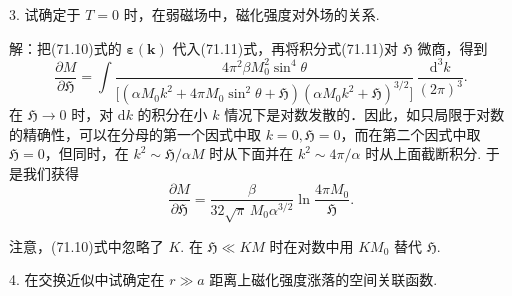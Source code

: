 \begin{xiti}
3. 试确定于 $T=0$ 时，在弱磁场中，磁化强度对外场的关系.

{\heiti 解：}把(71.10)式的 $\bm{\varepsilon}(\bm{k})$ 代入(71.11)式，再将积分式(71.11)对 $\mathfrak{H}$ 微商，得到
\begin{equation*}
\frac{\partial M}{\partial\mathfrak{H}}=\int
\frac{4\pi^2\beta M_0^2\sin^4\theta}
{\bigl[(\alpha M_0k^2+4\pi M_0\sin^2\theta+\mathfrak{H})(\alpha M_0k^2+\mathfrak{H})^{3/2}\bigr]}\,
\frac{\mathrm{d}^3k}{(2\pi)^3}.
\end{equation*}
在 $\mathfrak{H}\to0$ 时，对 $\mathrm{d}k$ 的积分在小 $k$ 情况下是对数发散的．因此，如只局限于对数的精确性，可以在分母的第一个因式中取 $k=0,\mathfrak{H}=0$，而在第二个因式中取 $\mathfrak{H}=0$，但同时，在 $k^2\sim\mathfrak{H}/\alpha M$ 时从下面并在 $k^2\sim4\pi/\alpha$ 时从上面截断积分. 于是我们获得
\begin{equation*}
\frac{\partial M}{\partial\mathfrak{H}}=\frac{\beta}{32\sqrt{\pi}\,M_0\alpha^{3/2}}
\ln\frac{4\pi M_0}{\mathfrak{H}}.
\end{equation*}

注意，(71.10)式中忽略了 $K$. 在 $\mathfrak{H}\ll KM$ 时在对数中用 $KM_0$ 替代 $\mathfrak{H}$.

4. 在交换近似中试确定在 $r\gg a$ 距离上磁化强度涨落的空间关联函数.


\end{xiti}

